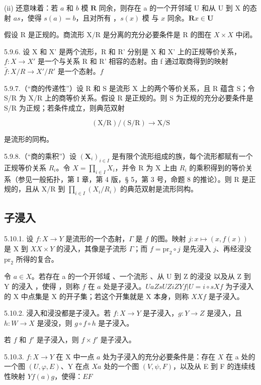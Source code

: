 (ii) 还意味着：若 \(a\) 和 \(b\) 模 \(\mathbf{R}\) 同余，则存在 a 的一个开邻域 U 和从 U 到 X 的态射 \(a\)\(s\)，使得 \(s(a) = b\)，且对所有 ，\(s(x)\) 模  与 \(x\) 同余。\(\mathbf{R}\)\(x \in \mathbf{U}\)

假设 R 是正规的。商流形 X/R 是分离的充分必要条件是 R 的图在 \(X \times X\) 中闭。

5.9.6. 设 X 和 X' 是两个流形，R 和 R' 分别是 X 和 X' 上的正规等价关系，\(f: X \to X'\) 是一个与关系 R 和 R' 相容的态射。由 f 通过取商得到的映射 \(\bar{f}: X/R \to X'/R'\) 是一个态射。\(f\)

5.9.7.（“商的传递性”）设 R 和 S 是流形 X 上的两个等价关系，且 R 蕴含 S；令 S/R 为 X/R 上的商等价关系。假设 R 是正规的。则 S 为正规的充分必要条件是 S/R 为正规；若条件成立，则典范双射

\[
(\mathrm{X} / \mathrm{R}) / (\mathrm{S} / \mathrm{R}) \rightarrow \mathrm{X} / \mathrm{S}
\]

是流形的同构。

5.9.8.（“商的乘积”）设 \((\mathbf{X}_{i})_{i\in I}\) 是有限个流形组成的族，每个流形都赋有一个正规等价关系 \(R_{i}\)。令 \(X = \prod_{i\in I} X_{i}\)，并令 R 为 X 上由 \(R_{i}\) 的乘积得到的等价关系（参见一般拓扑，第 I 章，第 4 版，§ 5，第 3 号，命题 8 的推论）。则 R 是正规的，且从 X/R 到 \(\prod_{i\in I}(X_{i}/R_{i})\) 的典范双射是流形同构。

\subsection{子浸入}

5.10.1. 设 \(f:X\to Y\) 是流形的一个态射，\(\Gamma\) 是 \(f\) 的图。映射 \(j:x\mapsto(x,f(x))\) 是 X 到 \(X\)\(X\times Y\) 的浸入，其像是子流形 \(\Gamma\)；而 \(f=\mathrm{pr}_{2}\circ j\) 是先浸入 \(j\)、再经浸没 \(\mathrm{pr}_{2}\) 所得的复合。

令 \(a \in X\)。若存在 a 的一个开邻域 、一个流形 、从 U 到 Z 的浸没  以及从 Z 到 Y 的浸入 ，使得 ，则称 \(f\) 在 \(a\) 处是子浸入。\(U\)\(a\)\(Z\)\(s\)\(U\)\(Z\)\(i\)\(Z\)\(Y\)\(f|U = i \circ s\)\(X\)\(f\) 为子浸入的 X 中点集是 X 的开子集；若这个开集就是 X 本身，则称 \(X\)\(X\)\(f\) 是子浸入。

5.10.2. 浸入和浸没都是子浸入。若 \(f: X \to Y\) 是子浸入，\(g: Y \to Z\) 是浸入，且 \(h: W \to X\) 是浸没，则 \(g \circ f \circ h\) 是子浸入。

若 \(f\) 和 \(f'\) 是子浸入，则 \(f \times f'\) 是子浸入。

5.10.3. \(f: X \to Y\) 在 X 中一点 \(a\) 处为子浸入的充分必要条件是：存在 \(X\) 在 a 处的一个图 \((U, \varphi, E)\)、Y 在点 \(X\)\(a\) 处的一个图 \((V, \psi, F)\)，以及从 E 到 F 的连续线性映射 \(Y\)\(f(a)\)\(g\)，使得：\(E\)\(F\)


